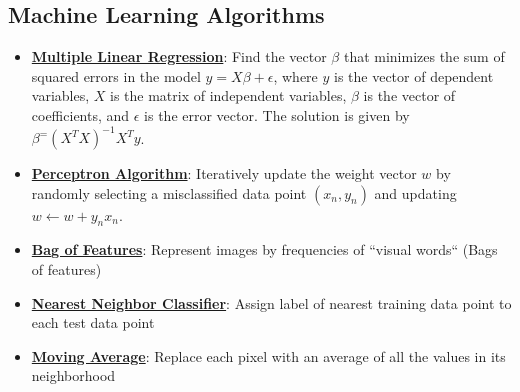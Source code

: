 \documentclass{article}%
\begin{document}
\subsection{Machine Learning Algorithms}%
\label{subsec:MachineLearningAlgorithms}%
\begin{itemize}[leftmargin=*]%
\item \href{https://purdue.brightspace.com/d2l/common/assets/pdfjs-d2l-dist/1.0.14-legacy/web/viewer.html?file=\%2Fcontent\%2Fenforced\%2F1095467-wl.202510.CS.24300.001\%2F05L2-ML Basics.pdf\%3Fou\%3D1095467\&lang=en-us\&container=d2l-fileviewer-rendered-pdf\&fullscreen=d2l-fileviewer-rendered-pdf-dialog\&height=667#page=11}{\textbf{Multiple Linear Regression}}: Find the vector $\beta$ that minimizes the sum of squared errors in the model $y = X\beta + \epsilon$, where $y$ is the vector of dependent variables, $X$ is the matrix of independent variables, $\beta$ is the vector of coefficients, and $\epsilon$ is the error vector. The solution is given by $\beta^ = (X^TX)^{-1}X^Ty$.%
\item \href{https://purdue.brightspace.com/d2l/common/assets/pdfjs-d2l-dist/1.0.14-legacy/web/viewer.html?file=\%2Fcontent\%2Fenforced\%2F1095467-wl.202510.CS.24300.001\%2F05L2-ML Basics.pdf\%3Fou\%3D1095467\&lang=en-us\&container=d2l-fileviewer-rendered-pdf\&fullscreen=d2l-fileviewer-rendered-pdf-dialog\&height=667#page=30}{\textbf{Perceptron Algorithm}}: Iteratively update the weight vector $w$ by randomly selecting a misclassified data point $(x_n, y_n)$ and updating $w \leftarrow w + y_nx_n$.%
\item \href{https://purdue.brightspace.com/d2l/common/assets/pdfjs-d2l-dist/1.0.14-legacy/web/viewer.html?file=\%2Fcontent\%2Fenforced\%2F1095467-wl.202510.CS.24300.001\%2F07L2-Vision.pdf\%3Fou\%3D1095467\&lang=en-us\&container=d2l-fileviewer-rendered-pdf\&fullscreen=d2l-fileviewer-rendered-pdf-dialog\&height=667#page=16}{\textbf{Bag of Features}}: Represent images by frequencies of ``visual words`` (Bags of features)%
\item \href{https://purdue.brightspace.com/d2l/common/assets/pdfjs-d2l-dist/1.0.14-legacy/web/viewer.html?file=\%2Fcontent\%2Fenforced\%2F1095467-wl.202510.CS.24300.001\%2F07L2-Vision.pdf\%3Fou\%3D1095467\&lang=en-us\&container=d2l-fileviewer-rendered-pdf\&fullscreen=d2l-fileviewer-rendered-pdf-dialog\&height=667#page=30}{\textbf{Nearest Neighbor Classifier}}: Assign label of nearest training data point to each test data point%
\item \href{https://purdue.brightspace.com/d2l/common/assets/pdfjs-d2l-dist/1.0.14-legacy/web/viewer.html?file=\%2Fcontent\%2Fenforced\%2F1095467-wl.202510.CS.24300.001\%2F07L2-Vision.pdf\%3Fou\%3D1095467\&lang=en-us\&container=d2l-fileviewer-rendered-pdf\&fullscreen=d2l-fileviewer-rendered-pdf-dialog\&height=667#page=38}{\textbf{Moving Average}}: Replace each pixel with an average of all the values in its neighborhood%

\end{itemize}
\end{document}
